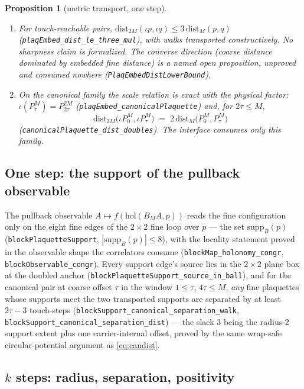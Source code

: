 \documentclass[11pt]{article}
\newtheorem{proposition}[theorem]{Proposition}
\theoremstyle{definition}
\newcommand{\lean}[1]{\texttt{#1}}
\newcommand{\dist}{\mathrm{dist}}
\newcommand{\holo}{\mathrm{hol}}
\begin{document}
\begin{proposition}[metric transport, one step]\label{prop:onestep}
\begin{enumerate}
\item[(i)] For touch-reachable pairs,
$\dist_{2M}(\iota p, \iota q) \le 3\, \dist_M(p, q)$
(\lean{plaqEmbed\_dist\_le\_three\_mul}), with walks transported
constructively.  No sharpness claim is formalized.  The converse
direction (coarse distance dominated by embedded fine distance) is a
named open proposition, unproved and consumed nowhere
(\lean{PlaqEmbedDistLowerBound}).
\item[(ii)] On the canonical family the scale relation is exact with
the physical factor: $\iota(P^M_\tau) = P^{2M}_{2\tau}$
(\lean{plaqEmbed\_canonicalPlaquette}) and, for $2\tau \le M$,
\[
\dist_{2M}\bigl(\iota P^M_0, \iota P^M_\tau\bigr)
 \;=\; 2\, \dist_M\bigl(P^M_0, P^M_\tau\bigr)
\]
(\lean{canonicalPlaquette\_dist\_doubles}).  The interface consumes
only this family.
\end{enumerate}
\end{proposition}

\subsection{One step: the support of the pullback observable}

The pullback observable $A \mapsto f(\holo(B_M A, p))$ reads the fine
configuration only on the eight fine edges of the $2 \times 2$ fine
loop over $p$ --- the set $\mathrm{supp}_B(p)$
(\lean{blockPlaquetteSupport}, $|\mathrm{supp}_B(p)| \le 8$), with the
locality statement proved in the observable shape the correlators
consume (\lean{blockMap\_holonomy\_congr},
\lean{blockObservable\_congr}).  Every support edge's source lies in
the $2 \times 2$ plane box at the doubled anchor
(\lean{blockPlaquetteSupport\_source\_in\_ball}), and for the
canonical pair at coarse offset $\tau$ in the window
$1 \le \tau$, $4\tau \le M$, \emph{any} fine plaquettes whose supports
meet the two transported supports are separated by at least
$2\tau - 3$ touch-steps
(\lean{blockSupport\_canonical\_separation\_walk},
\lean{blockSupport\_canonical\_separation\_dist}) --- the slack $3$
being the radius-$2$ support extent plus one carrier-internal offset,
proved by the same wrap-safe circular-potential argument as
\eqref{eq:candist}.

\subsection{$k$ steps: radius, separation, positivity}
\end{document}
